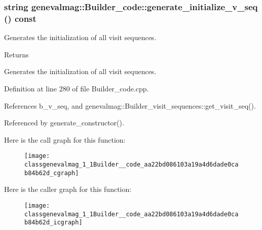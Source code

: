 \hypertarget{classgenevalmag_1_1Builder__code_aa22bd086103a19a4d6dade0cab84b62d}{
\subsubsection[{generate\_\-initialize\_\-v\_\-seq}]{\setlength{\rightskip}{0pt plus 5cm}string genevalmag::Builder\_\-code::generate\_\-initialize\_\-v\_\-seq () const}}
\label{classgenevalmag_1_1Builder__code_aa22bd086103a19a4d6dade0cab84b62d}
Generates the initialization of all visit sequences. \begin{DoxyReturn}{Returns}

\end{DoxyReturn}
Generates the initialization of all visit sequences. 

Definition at line 280 of file Builder\_\-code.cpp.



References b\_\-v\_\-seq, and genevalmag::Builder\_\-visit\_\-sequences::get\_\-visit\_\-seq().



Referenced by generate\_\-constructor().



Here is the call graph for this function:\nopagebreak
\begin{figure}[H]
\begin{center}
\leavevmode
\texttt{[image: classgenevalmag\_1\_1Builder\_\_code\_aa22bd086103a19a4d6dade0cab84b62d\_cgraph]}
\end{center}
\end{figure}




Here is the caller graph for this function:\nopagebreak
\begin{figure}[H]
\begin{center}
\leavevmode
\texttt{[image: classgenevalmag\_1\_1Builder\_\_code\_aa22bd086103a19a4d6dade0cab84b62d\_icgraph]}
\end{center}
\end{figure}


